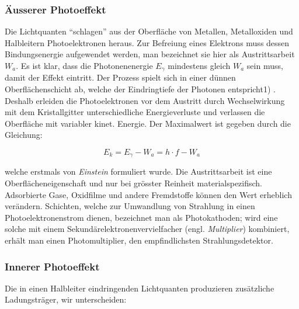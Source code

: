 \subsubsection{\"Ausserer Photoeffekt}

Die Lichtquanten ``schlagen'' aus der Oberfl\"ache von  Metallen, Metalloxiden
und  Halbleitern  Photoelektronen  heraus. Zur Befreiung eines Elektrons  muss
dessen  Bindungsenergie  aufgewendet  werden,  man  bezeichnet  sie  hier  als
Austrittsarbeit  $W_a$.  Es ist klar, dass  die  Photonenenergie  $E_{\gamma}$
mindestens  gleich  $W_a$  sein muss, damit der Effekt eintritt.  Der  Prozess
spielt   sich   in   einer   d\"unnen  Oberfl\"achenschicht  ab,  welche   der
Eindringtiefe der Photonen entspricht1) . Deshalb erleiden die Photoelektronen
vor dem Austritt durch Wechselwirkung  mit dem Kristallgitter unterschiedliche
Energieverluste und verlassen die Oberfl\"ache mit variabler  kinet.  Energie.
Der Maximalwert ist gegeben durch die Gleichung:

\begin{equation}
    E_k = E_{\gamma} - W_a = h \cdot f - W_a
\end{equation}

welche erstmals von  \textit{Einstein}  formuliert  wurde. Die Austrittsarbeit
ist   eine   Oberfl\"acheneigenschaft   und   nur   bei   gr\"osster  Reinheit
materialspezifisch.   Adsorbierte  Gase,  Oxidfilme  und  andere   Fremdstoffe
k\"onnen den  Wert erheblich ver\"andern. Schichten, welche zur Umwandlung von
Strahlung  in   einen   Photoelektronenstrom   dienen,   bezeichnet   man  als
Photokathoden; wird eine solche  mit  einem  Sekund\"arelektronenvervielfacher
(engl. \textit{Multiplier}) kombiniert,  erh\"alt  man  einen Photomultiplier,
den empfindlichsten Strahlungsdetektor.


\subsubsection{Innerer Photoeffekt}

Die in einen  Halbleiter  eindringenden Lichtquanten produzieren zus\"atzliche
Ladungstr\"ager, wir unterscheiden:


